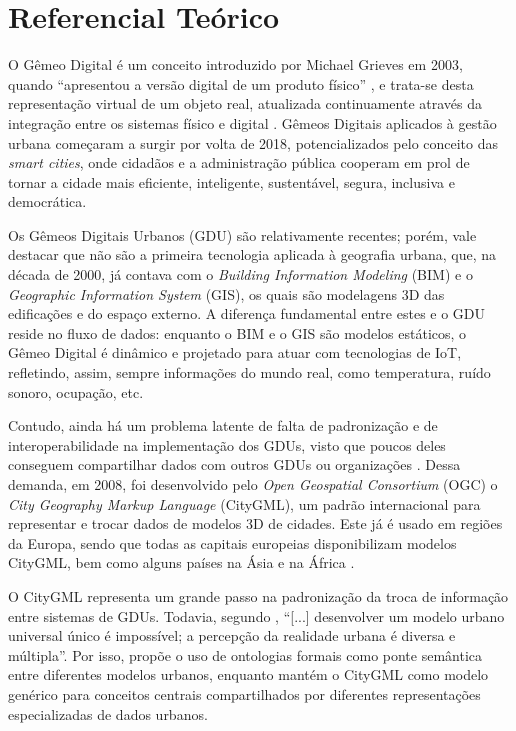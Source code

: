 \documentclass[
  article,   %
  11pt,      %
  oneside,   %
  a4paper,   %
  english,   %
  brazil,    %
  sumario=tradicional
]{abntex2}
\newcommand{\en}[1]{\foreignlanguage{english}{\textit{#1}}}
\begin{document}
\section{Referencial Teórico}

O Gêmeo Digital é um conceito introduzido por Michael Grieves em 2003, quando ``apresentou a versão
digital de um produto físico'' , e trata-se desta representação
virtual de um objeto real, atualizada continuamente através da integração entre os sistemas físico e
digital \cite{DIHAN2024e26503}.
Gêmeos Digitais aplicados à gestão urbana começaram a surgir por volta de 2018, potencializados
pelo conceito das \en{smart cities}, onde cidadãos e a administração pública cooperam em prol de
tornar a cidade mais eficiente, inteligente, sustentável, segura, inclusiva e democrática.

Os Gêmeos Digitais Urbanos (GDU) são relativamente recentes; porém, vale destacar que não são a
primeira tecnologia aplicada à geografia urbana, que, na década de 2000, já contava com o
\en{Building Information Modeling} (BIM) e o \en{Geographic Information System} (GIS), os quais são
modelagens 3D das edificações e do espaço externo.
A diferença fundamental entre estes e o GDU reside no fluxo de dados: enquanto o BIM e o GIS são
modelos estáticos, o Gêmeo Digital é dinâmico e projetado para atuar com tecnologias de IoT,
refletindo, assim, sempre informações do mundo real, como temperatura, ruído sonoro, ocupação, etc.

Contudo, ainda há um problema latente de falta de padronização e de interoperabilidade na
implementação dos GDUs, visto que poucos deles conseguem compartilhar dados com outros GDUs ou
organizações \cite{FERREBIGORRA2022103905}.
Dessa demanda, em 2008, foi desenvolvido pelo \en{Open Geospatial Consortium} (OGC) o \en{City
  Geography Markup Language} (CityGML), um padrão internacional para representar e trocar dados de
modelos 3D de cidades.
Este já é usado em regiões da Europa, sendo que todas as capitais europeias disponibilizam modelos
CityGML, bem como alguns países na Ásia e na África \cite{buildings13071758}.

O CityGML representa um grande passo na padronização da troca de informação entre sistemas de GDUs.
Todavia, segundo , ``[...]
desenvolver um modelo urbano universal único é impossível; a percepção da realidade urbana é
diversa e múltipla''.
Por isso, propõe o uso de ontologias formais como ponte semântica entre diferentes modelos urbanos,
enquanto mantém o CityGML como modelo genérico para conceitos centrais compartilhados por
diferentes representações especializadas de dados urbanos.
\end{document}
